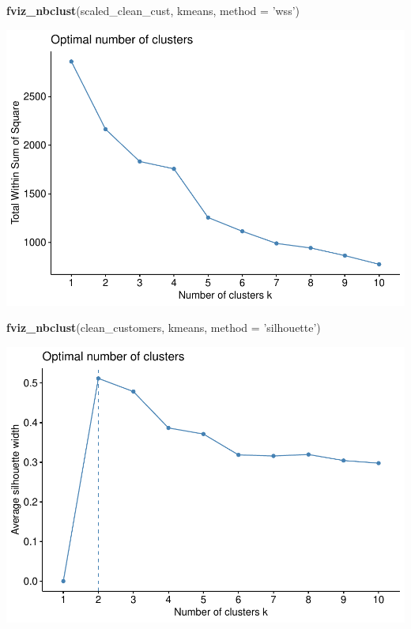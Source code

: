 \documentclass[
  english,
  man]{apa6}
\newenvironment{Shaded}{\begin{snugshade}}{\end{snugshade}}
\newcommand{\DataTypeTok}[1]{\textcolor[rgb]{0.13,0.29,0.53}{#1}}
\newcommand{\KeywordTok}[1]{\textcolor[rgb]{0.13,0.29,0.53}{\textbf{#1}}}
\newcommand{\NormalTok}[1]{#1}
\newcommand{\StringTok}[1]{\textcolor[rgb]{0.31,0.60,0.02}{#1}}
\begin{document}
\begin{Shaded}
\begin{Highlighting}[]
\KeywordTok{fviz_nbclust}\NormalTok{(scaled_clean_cust, kmeans, }\DataTypeTok{method =} \StringTok{'wss'}\NormalTok{)}
\end{Highlighting}
\end{Shaded}

\includegraphics{MSDS680-Week-6-Kmeans-and-HCA_files/figure-latex/kmeans investigation-2.pdf}

\begin{Shaded}
\begin{Highlighting}[]
\KeywordTok{fviz_nbclust}\NormalTok{(clean_customers, kmeans, }\DataTypeTok{method =} \StringTok{'silhouette'}\NormalTok{)}
\end{Highlighting}
\end{Shaded}

\includegraphics{MSDS680-Week-6-Kmeans-and-HCA_files/figure-latex/kmeans investigation-3.pdf}
\end{document}
